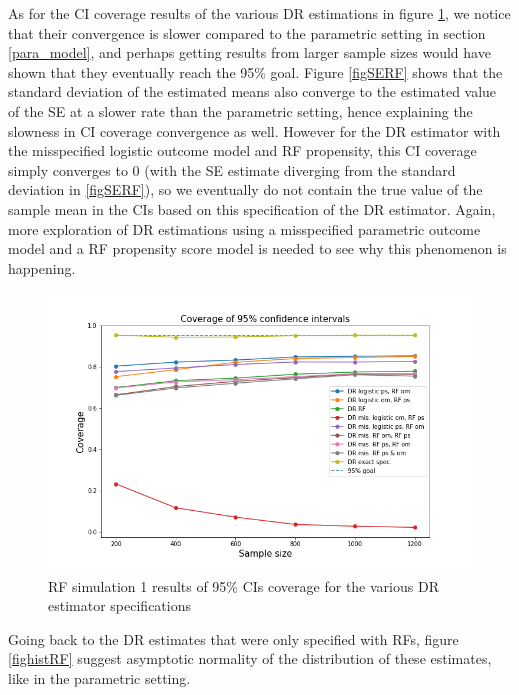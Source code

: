 \documentclass[12pt,twoside]{article}
\begin{document}
As for the CI coverage results of the various DR estimations in figure \ref{figCIRF}, we notice that their convergence is slower compared to the parametric setting in section \ref{para_model}, and perhaps getting results from larger sample sizes would have shown that they eventually reach the 95\% goal. Figure \ref{figSERF} shows that the standard deviation of the estimated means also converge to the estimated value of the SE at a slower rate than the parametric setting, hence explaining the slowness in CI coverage convergence as well. However for the DR estimator with the misspecified logistic outcome model and RF propensity, this CI coverage simply converges to 0 (with the SE estimate diverging from the standard deviation in \ref{figSERF}), so we eventually do not contain the true value of the sample mean in the CIs based on this specification of the DR estimator. Again, more exploration of DR estimations using a misspecified parametric outcome model and a RF propensity score model is needed to see why this phenomenon is happening.

\begin{figure}[h!]
    \centering
    \includegraphics[width = 0.9\columnwidth]{figures/CIRF.png}
    \caption{RF simulation 1 results of 95\% CIs coverage for the various DR estimator specifications}
    \label{figCIRF}
\end{figure}

Going back to the DR estimates that were only specified with RFs, figure \ref{fighistRF} suggest asymptotic normality of the distribution of these estimates, like in the parametric setting. \\
\end{document}
